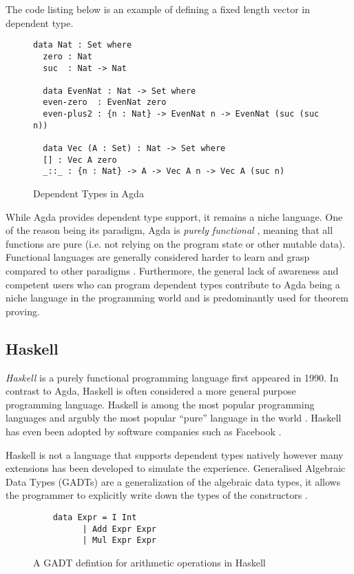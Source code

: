 \documentclass[a4paper,12pt]{report}
\begin{document}
\par
The code listing below is an example of defining a fixed length vector in 
dependent type. 

\begin{figure}[H]
  \begin{lstlisting}[mathescape=true] 
  data Nat : Set where 
  zero : Nat
  suc  : Nat -> Nat  
  
  data EvenNat : Nat -> Set where
  even-zero  : EvenNat zero
  even-plus2 : {n : Nat} -> EvenNat n -> EvenNat (suc (suc n))
  
  data Vec (A : Set) : Nat -> Set where
  [] : Vec A zero
  _::_ : {n : Nat} -> A -> Vec A n -> Vec A (suc n)
  \end{lstlisting}
  \caption{Dependent Types in Agda}
\end{figure}

\par
While Agda provides dependent type support, it remains a niche language. One of 
the reason being its paradigm, Agda is \textit{purely functional} \cite{purelyFP}, meaning that 
all functions are pure (i.e. not relying on the program state or other mutable 
data). Functional languages are generally considered harder to learn and grasp 
compared to other paradigms \cite{fpHarder}. Furthermore, the general lack of 
awareness and competent users who can program dependent types contribute to Agda 
being a niche language in the programming world and is 
predominantly used for theorem proving.

\subsection{Haskell}
\textit{Haskell} \cite{haskell} is a purely functional programming language first appeared in 1990. In 
contrast to Agda, Haskell is often considered a more general purpose programming 
language. Haskell is among the most popular programming languages and argubly 
the most popular ``pure'' language in the world \cite{pypl}. 
Haskell has even been adopted by software companies such as Facebook \cite{haskellFB}.

\par
Haskell is not a language that supports dependent types natively however many 
extensions has been developed to simulate the experience. 
Generalised Algebraic Data Types (GADTs) are a generalization of the 
algebraic data types, it allows the programmer to 
explicitly write down the types of the constructors \cite{haskellGADT}. 
\begin{figure}[H]
  \begin{lstlisting}
    data Expr = I Int        
          | Add Expr Expr 
          | Mul Expr Expr 
  \end{lstlisting}
  \caption{A GADT defintion for arithmetic operations in Haskell}
\end{figure}
\end{document}
